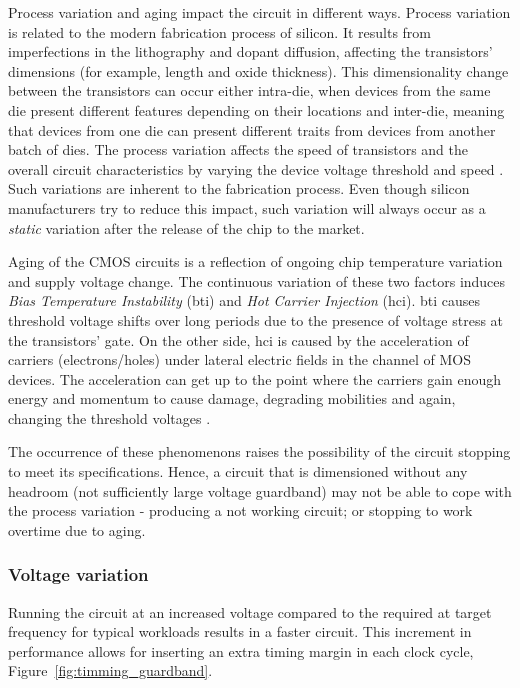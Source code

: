 Process variation and aging impact the circuit in different ways. Process variation is related to the modern fabrication process of silicon. It results from imperfections in the lithography and dopant diffusion, affecting the transistors' dimensions (for example, length and oxide thickness). This dimensionality change between the transistors can occur either intra-die, when devices from the same die present different features depending on their locations and inter-die, meaning that devices from one die can present different traits from devices from another batch of dies. The process variation affects the speed of transistors and the overall circuit characteristics by varying the device voltage threshold and speed \cite{schemmert_threshold-voltage_1974}\cite{thomas_core_2016}. Such variations are inherent to the fabrication process. Even though silicon manufacturers try to reduce this impact, such variation will always occur as a \textit{static} variation after the release of the chip to the market.

Aging of the CMOS circuits is a reflection of ongoing chip temperature variation and supply voltage change. The continuous variation of these two factors induces \textit{Bias Temperature Instability} (\acrshort{bti}) and  \textit{Hot Carrier Injection} (\acrshort{hci}). \acrshort{bti} causes threshold voltage shifts over long periods due to the presence of voltage stress at the transistors' gate. On the other side, \acrshort{hci} is caused by the acceleration of carriers (electrons/holes) under lateral electric fields in the channel of MOS devices. The acceleration can get up to the point where the carriers gain enough energy and momentum to cause damage, degrading mobilities and again, changing the threshold voltages 
\cite{sapatnekar_what_nodate}.

The occurrence of these phenomenons raises the possibility of the circuit stopping to meet its specifications. Hence, a circuit that is dimensioned without any headroom (not sufficiently large voltage guardband) may not be able to cope with the process variation - producing a not working circuit; or stopping to work overtime due to aging.



\subsubsection{Voltage variation}

Running the circuit at an increased voltage compared to the required at target frequency for typical workloads results in a faster circuit. This increment in performance allows for inserting an extra timing margin in each clock cycle, Figure~\ref{fig:timming_guardband}. 

